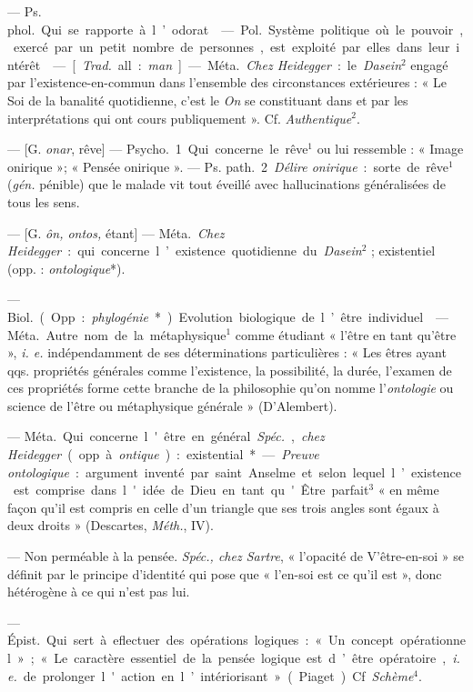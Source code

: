 \begin{itemize}[leftmargin=1cm, label=, itemsep=1pt]
 — \si{Ps. phol.} Qui se rapporte à l’odorat.

 — \si{Pol.} Système politique où le pouvoir, exercé par un
petit nombre de personnes, est exploité par elles dans leur intérêt.

 — [{\it Trad.} all. : {\it man}] — \si{Méta.} {\it Chez Heidegger} :
le {\it Dasein}$^2$ engagé par l’existence-en-commun dans l’ensemble des
circonstances extérieures : « Le Soi de la banalité quotidienne, c’est le
{\it On} se constituant dans et par les interprétations qui ont cours
publiquement ». Cf. {\it Authentique}$^2$.

 — [G. {\it onar}, rêve] — \si{Psycho.} 1. Qui concerne le
rêve$^1$ ou lui ressemble : « Image onirique »; « Pensée onirique ». —
\si{Ps. path.} 2 {\it Délire onirique} : sorte de rêve$^1$ ({\it gén.}
pénible) que le malade vit tout éveillé avec hallucinations généralisées de
tous les sens.

 — [G. {\it ôn, ontos,} étant] — \si{Méta.} {\it Chez
Heidegger} : qui concerne l’existence quotidienne du {\it Dasein}$^2$ ;
existentiel (opp. : {\it ontologique}*).

 — \si{Biol.} (Opp. : {\it phylogénie}*). Evolution biologique
de l’être individuel.

 — \si{Méta.} Autre nom de la métaphysique$^1$ comme étudiant «
l'être en tant qu'être », {\it i. e.} indépendamment de ses déterminations
particulières : « Les êtres ayant qqs. propriétés générales comme l’existence,
la possibilité, la durée, l’examen de ces propriétés forme cette branche de
la philosophie qu’on nomme l’{\it ontologie} ou science de l'être ou
métaphysique générale » (D’Alembert).

 — \si{Méta.} Qui concerne l'être en général. {\it Spéc.},
{\it chez Heidegger} (opp. à {\it ontique}) : existential*. — {\it Preuve
ontologique} : argument inventé par saint Anselme et selon lequel l’existence
est comprise dans l'idée de Dieu en tant qu'Être parfait$^3$ « en même façon
qu'il est compris en celle d’un triangle que ses trois angles sont égaux à
deux droits » (Descartes, {\it Méth.}, IV).

 — Non perméable à la pensée. {\it Spéc., chez Sartre}, «
l’opacité de V’être-en-soi » se définit par le principe d'identité qui pose
que « l’en-soi est ce qu’il est », donc hétérogène à ce qui n’est pas lui.

 — \si{Épist.} Qui sert à eflectuer des
opérations logiques : « Un concept opérationnel » ; « Le caractère essentiel
de la pensée logique est d’être opératoire, {\it i. e.} de prolonger l'action
en l’intériorisant » (Piaget). Cf. {\it Schème}$^4$.


\end{itemize}
